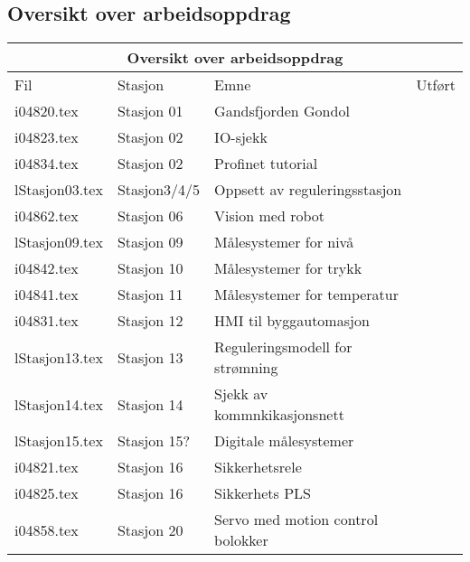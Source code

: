 \subsection{Oversikt over arbeidsoppdrag}
\begin{center}
	\begin{tabular}{| m{2cm} |m{2cm} |m{5cm} |m{1cm} |} 
\hline
	\multicolumn{4}{|c|}{\textbf{\cellcolor[HTML]{D5D5D5}Oversikt over arbeidsoppdrag}} \\
\hline
\hline
\rowcolor [HTML]{D5D5D5}
Fil	&Stasjon&Emne&Utført\\ \hline
	i04820.tex  & Stasjon 01 & Gandsfjorden Gondol& \\ \cline{1-4}
	i04823.tex  & Stasjon 02 & IO-sjekk&\\ \cline{1-4}
	i04834.tex  & Stasjon 02 &  Profinet tutorial&\\ \cline{1-4}
	lStasjon03.tex  & Stasjon3/4/5 & Oppsett av reguleringsstasjon&\\ \cline{1-4}
	i04862.tex  & Stasjon 06 & Vision med robot &\\ \hline
	lStasjon09.tex  & Stasjon 09 & Målesystemer for nivå&\\ \cline{1-4}
	i04842.tex  & Stasjon 10 & Målesystemer for trykk&\\ \cline{1-4}
	i04841.tex  & Stasjon 11 & Målesystemer for temperatur& \\ \cline{1-4}
	i04831.tex  & Stasjon 12 & HMI til byggautomasjon & \\ \cline{1-4}
	lStasjon13.tex  & Stasjon 13 & Reguleringsmodell for strømning&\\ \cline{1-4}
	lStasjon14.tex  & Stasjon 14 & Sjekk av kommnkikasjonsnett&\\ \cline{1-4}
	lStasjon15.tex  & Stasjon 15? & Digitale målesystemer &\\ \hline
	i04821.tex  & Stasjon 16 & Sikkerhetsrele& \\ \cline{1-4}
	i04825.tex  & Stasjon 16 & Sikkerhets PLS &\\ \cline{1-4}
	i04858.tex  & Stasjon 20 & Servo med motion control bolokker&\\  \cline{1-4}
\end{tabular}
\end{center}
